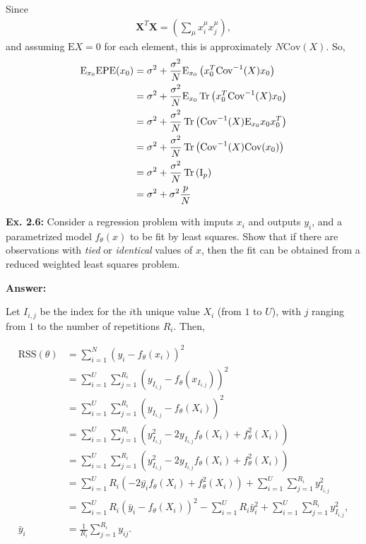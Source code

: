 \documentclass{article}
\begin{document}
Since
\begin{align}
	\mathbf X^T\mathbf X=\left(\sum_\mu x_i^\mu x_j^\mu\right),
\end{align}
and assuming $\mathrm EX=0$ for each element, this is approximately $N\mathrm{Cov}(X)$. So,
\begin{align}
	\mathrm E_{x_0}\mathrm{EPE}(x_0)&=\sigma^2+\frac{\sigma^2}{N}\mathrm E_{x_0}\left(x_0^T\mathrm{Cov}^{-1}(X)x_0\right)\\
	&=\sigma^2+\frac{\sigma^2}{N}\mathrm E_{x_0}\Tr\left(x_0^T\mathrm{Cov}^{-1}(X)x_0\right)\\
	&=\sigma^2+\frac{\sigma^2}{N}\Tr\left(\mathrm{Cov}^{-1}(X)\mathrm E_{x_0}x_0x_0^T\right)\\
	&=\sigma^2+\frac{\sigma^2}{N}\Tr\left(\mathrm{Cov}^{-1}(X)\mathrm{Cov}(x_0)\right)\\
	&=\sigma^2+\frac{\sigma^2}{N}\Tr\left(\mathrm I_p\right)\\
	&=\sigma^2+\sigma^2\frac{p}{N}\\
\end{align}

\textbf{Ex. 2.6: }Consider a regression problem with imputs $x_i$ and outputs $y_i$, and a parametrized model $f_\theta(x)$ to be fit by least squares. Show that if there are observations with \textit{tied} or \textit{identical} values of $x$, then the fit can be obtained from a reduced weighted least squares problem.

\textbf{Answer:}

Let $I_{i,j}$ be the index for the $i$th unique value $X_i$ (from $1$ to $U$), with $j$ ranging from $1$ to the number of repetitions $R_i$. Then,

\begin{align}
	\mathrm{RSS}(\theta)&=\sum_{i=1}^N\left(y_i-f_\theta(x_i)\right)^2\\
	&=\sum_{i=1}^U\sum_{j=1}^{R_i}\left(y_{I_{i,j}}-f_\theta(x_{I_{i,j}})\right)^2\\
	&=\sum_{i=1}^U\sum_{j=1}^{R_i}\left(y_{I_{i,j}}-f_\theta(X_i)\right)^2\\
	&=\sum_{i=1}^U\sum_{j=1}^{R_i}\left(y_{I_{i,j}}^2-2y_{I_{i,j}}f_\theta(X_i)+f_\theta^2(X_i)\right)\\
	&=\sum_{i=1}^U\sum_{j=1}^{R_i}\left(y_{I_{i,j}}^2-2y_{I_{i,j}}f_\theta(X_i)+f_\theta^2(X_i)\right)\\
	&=\sum_{i=1}^UR_i\left(-2\bar{y_i}f_\theta(X_i)+f_\theta^2(X_i)\right)+\sum_{i=1}^U\sum_{j=1}^{R_i}y_{I_{i,j}}^2\\
	&=\sum_{i=1}^UR_i\left(\bar{y}_i-f_\theta(X_i)\right)^2-\sum_{i=1}^UR_i\bar{y}_i^2+\sum_{i=1}^U\sum_{j=1}^{R_i}y_{I_{i,j}}^2,\\
	\bar{y}_i&=\frac1{R_i}\sum_{j=1}^{R_i}y_{ij}.
\end{align}
\end{document}
